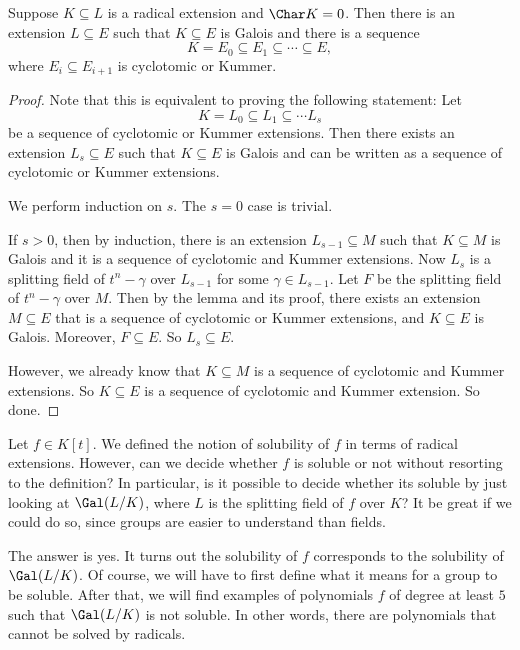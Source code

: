 \documentclass[a4paper]{article}
\begin{document}
\begin{thm}
  Suppose $K\subseteq L$ is a radical extension and $\Char K = 0$. Then there is an extension $L\subseteq E$ such that $K\subseteq E$ is Galois and there is a sequence
  \[
    K = E_0 \subseteq E_1 \subseteq \cdots \subseteq E,
  \]
  where $E_i \subseteq E_{i + 1}$ is cyclotomic or Kummer.
\end{thm}

\begin{proof}
  Note that this is equivalent to proving the following statement: Let
  \[
    K = L_0 \subseteq L_1 \subseteq \cdots L_s
  \]
  be a sequence of cyclotomic or Kummer extensions. Then there exists an extension $L_s \subseteq E$ such that $K \subseteq E$ is Galois and can be written as a sequence of cyclotomic or Kummer extensions.

  We perform induction on $s$. The $s = 0$ case is trivial.

  If $s > 0$, then by induction, there is an extension $L_{s - 1} \subseteq M$ such that $K\subseteq M$ is Galois and it is a sequence of cyclotomic and Kummer extensions. Now $L_s$ is a splitting field of $t^n - \gamma$ over $L_{s - 1}$ for some $\gamma \in L_{s - 1}$. Let $F$ be the splitting field of $t^n - \gamma$ over $M$. Then by the lemma and its proof, there exists an extension $M \subseteq E$ that is a sequence of cyclotomic or Kummer extensions, and $K\subseteq E$ is Galois. Moreover, $F\subseteq E$. So $L_s \subseteq E$.

  However, we already know that $K\subseteq M$ is a sequence of cyclotomic and Kummer extensions. So $K\subseteq E$ is a sequence of cyclotomic and Kummer extension. So done.
\end{proof}
Let $f \in K[t]$. We defined the notion of solubility of $f$ in terms of radical extensions. However, can we decide whether $f$ is soluble or not without resorting to the definition? In particular, is it possible to decide whether its soluble by just looking at $\Gal(L/K)$, where $L$ is the splitting field of $f$ over $K$? It be great if we could do so, since groups are easier to understand than fields.

The answer is yes. It turns out the solubility of $f$ corresponds to the solubility of $\Gal(L/K)$. Of course, we will have to first define what it means for a group to be soluble. After that, we will find examples of polynomials $f$ of degree at least $5$ such that $\Gal(L/K)$ is not soluble. In other words, there are polynomials that cannot be solved by radicals.
\end{document}
